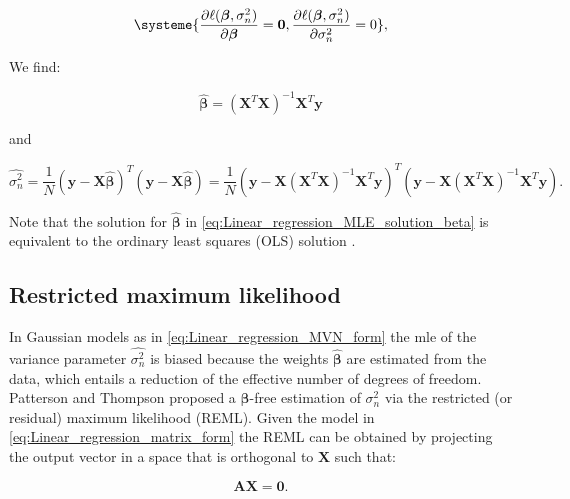 \begin{equation} \label{eq:Linear_regression_MLE_system}
\systeme{
    \dfrac{\partial \ell(\boldsymbol{\beta}, \sigma_n^2)}{\partial \boldsymbol{\beta}} = \mathbf{0},
    \dfrac{\partial \ell(\boldsymbol{\beta}, \sigma_n^2)}{\partial \sigma_n^2} = 0
    },
\end{equation}

We find:

\begin{equation} \label{eq:Linear_regression_MLE_solution_beta}
\hat{\boldsymbol{\beta}} = (\mathbf{X}^T\mathbf{X})^{-1}\mathbf{X}^T\mathbf{y} 
\end{equation}

and

\begin{equation} \label{eq:Linear_regression_MLE_solution_sigma}
 \hat{\sigma_n^2} = \frac{1}{N}(\mathbf{y}-\mathbf{X}\hat{\boldsymbol{\beta}})^T(\mathbf{y}-\mathbf{X}\hat{\boldsymbol{\beta}}) = \frac{1}{N}(\mathbf{y}-\mathbf{X}(\mathbf{X}^T\mathbf{X})^{-1}\mathbf{X}^T\mathbf{y})^T(\mathbf{y}-\mathbf{X}(\mathbf{X}^T\mathbf{X})^{-1}\mathbf{X}^T\mathbf{y}). 
\end{equation}

Note that the solution for $\hat{\boldsymbol{\beta}}$ in \eqref{eq:Linear_regression_MLE_solution_beta} is equivalent to the ordinary least squares (OLS) solution \cite{laird2010fundamentals}.


\subsection{Restricted maximum likelihood}

In Gaussian models as in \eqref{eq:Linear_regression_MVN_form} the \gls{mle} of the variance parameter $\hat{\sigma_n^2}$ is biased because the weights $\hat{\boldsymbol{\beta}}$ are estimated from the data, which entails a reduction of the effective number of degrees of freedom.
Patterson and Thompson \cite{patterson1971recovery} proposed a $\boldsymbol{\beta}$-free estimation of $\sigma_n^2$ via the restricted (or residual) maximum likelihood (REML).
Given the model in \eqref{eq:Linear_regression_matrix_form} the REML can be obtained by projecting the output vector in a space that is orthogonal to $\mathbf{X}$ such that:

\begin{equation}\label{eq:REML_0_projection}
    \mathbf{A}\mathbf{X} = \mathbf{0}.
\end{equation}

